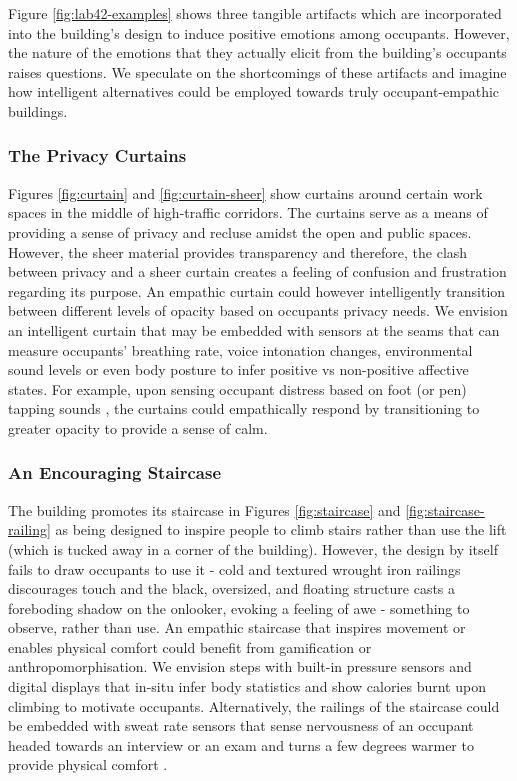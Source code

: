 \documentclass [sigconf] {acmart}
\begin{document}
Figure \ref{fig:lab42-examples} shows three tangible artifacts which are incorporated into the building's design to induce positive emotions among occupants. However, the nature of the emotions that they actually elicit from the building's occupants raises questions. We speculate on the shortcomings of these artifacts and imagine how intelligent alternatives could be employed towards truly occupant-empathic buildings.

\subsubsection*{The Privacy Curtains}
Figures \ref{fig:curtain} and \ref{fig:curtain-sheer} show curtains around certain work spaces in the middle of high-traffic corridors. The curtains serve as a means of providing a sense of privacy and recluse amidst the open and public spaces. However, the sheer material provides transparency and therefore, the clash between privacy and a sheer curtain creates a feeling of confusion and frustration regarding its purpose. An empathic curtain could however intelligently transition between different levels of opacity based on occupants privacy needs. We envision an intelligent curtain that may be embedded with sensors at the seams that can measure occupants' breathing rate, voice intonation changes, environmental sound levels or even body posture to infer positive vs non-positive affective states. For example, upon sensing occupant distress based on foot (or pen) tapping sounds \cite{lu2012stresssense}, the curtains could empathically respond by transitioning to greater opacity to provide a sense of calm. 

\subsubsection*{An Encouraging Staircase}
The building promotes its staircase in Figures \ref{fig:staircase} and \ref{fig:staircase-railing} as being designed to inspire people to climb stairs rather than use the lift (which is tucked away in a corner of the building). However, the design by itself fails to draw occupants to use it - cold and textured wrought iron railings discourages touch and the black, oversized, and floating structure casts a foreboding  shadow on the onlooker, evoking a feeling of awe - something to observe, rather than use. An empathic staircase that inspires movement or enables physical comfort could benefit from gamification or anthropomorphisation. We envision steps with built-in pressure sensors and digital displays that in-situ infer body statistics and show calories burnt upon climbing to motivate occupants. Alternatively, the railings of the staircase could be embedded with sweat rate sensors that sense nervousness of an occupant headed towards an interview or an exam and turns  a few degrees warmer to provide physical comfort \cite{sim2018wearable}.
 
\end{document}
